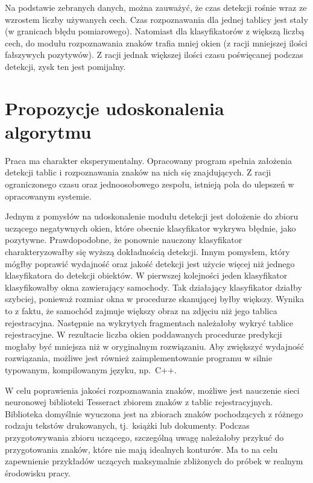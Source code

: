 Na podstawie zebranych danych, można zauważyć, że czas detekcji rośnie wraz ze wzrostem liczby używanych cech.
Czas rozpoznawania dla jednej tablicy jest stały (w granicach błędu pomiarowego).
Natomiast dla klasyfikatorów z większą liczbą cech, do modułu rozpoznawania znaków trafia mniej okien (z racji mniejszej ilości fałszywych pozytywów).
Z racji jednak większej ilości czasu poświęcanej podczas detekcji, zysk ten jest pomijalny.


\section{Propozycje udoskonalenia algorytmu}
Praca ma charakter eksperymentalny.
Opracowany program spełnia założenia detekcji tablic i rozpoznawania znaków na nich się znajdujących.
Z racji ograniczonego czasu oraz jednoosobowego zespołu, istnieją pola do ulepszeń w opracowanym systemie.

Jednym z pomysłów na udoskonalenie modułu detekcji jest dołożenie do zbioru uczącego negatywnych okien, które obecnie klasyfikator wykrywa błędnie, jako pozytywne.
Prawdopodobne, że ponownie nauczony klasyfikator charakteryzowałby się wyższą dokładnością detekcji.
Innym pomysłem, który mógłby poprawić wydajność oraz jakość detekcji jest użycie więcej niż jednego klasyfikatora do detekcji obiektów.
W pierwszej kolejności jeden klasyfikator klasyfikowałby okna zawierający samochody.
Tak działający klasyfikator działby szybciej, ponieważ rozmiar okna w procedurze skanującej byłby większy.
Wynika to z faktu, że samochód zajmuje większy obraz na zdjęciu niż jego tablica rejestracyjna.
Następnie na wykrytych fragmentach należałoby wykryć tablice rejestracyjne.
W rezultacie liczba okien poddawanych procedurze predykcji mogłaby być mniejsza niż w oryginalnym rozwiązaniu.
Aby zwiększyć wydajność rozwiązania, możliwe jest również zaimplementowanie programu w silnie typowanym, kompilowanym języku, np.\ C++.

W celu poprawienia jakości rozpoznawania znaków, możliwe jest nauczenie sieci neuronowej biblioteki Tesseract zbiorem znaków z tablic rejestracyjnych.
Biblioteka domyślnie wyuczona jest na zbiorach znaków pochodzących z różnego rodzaju tekstów drukowanych, tj.\ książki lub dokumenty.
Podczas przygotowywania zbioru uczącego, szczególną uwagę należałoby przykuć do przygotowania znaków, które nie mają idealnych konturów.
Ma to na celu zapewnienie przykładów uczących maksymalnie zbliżonych do próbek w realnym środowisku pracy.